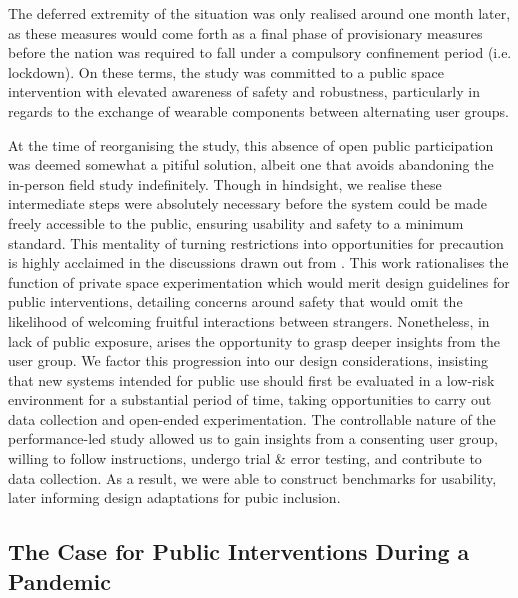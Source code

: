 The deferred extremity of the situation was only realised around one month later, as these measures would come forth as a final phase of provisionary measures before the nation was required to fall under a compulsory confinement period (i.e. lockdown). On these terms, the study was committed to a public space intervention with elevated awareness of safety and robustness, particularly in regards to the exchange of wearable components between alternating user groups.

At the time of reorganising the study, this absence of open public participation was deemed somewhat a pitiful solution, albeit one that avoids abandoning the in-person field study indefinitely. Though in hindsight, we realise these intermediate steps were absolutely necessary before the system could be made freely accessible to the public, ensuring usability and safety to a minimum standard. This mentality of turning restrictions into opportunities for precaution is highly acclaimed in the discussions drawn out from \citeauthor{howell_life-affirming_2019} \cite{howell_life-affirming_2019}. This work rationalises the function of private space experimentation which would merit design guidelines for public interventions, detailing concerns around safety that would omit the likelihood of welcoming fruitful interactions between strangers. Nonetheless, in lack of public exposure, arises the opportunity to grasp deeper insights from the user group. We factor this progression into our design considerations, insisting that new systems intended for public use should first be evaluated in a low-risk environment for a substantial period of time, taking opportunities to carry out data collection and open-ended experimentation. The controllable nature of the performance-led study allowed us to gain insights from a consenting user group, willing to follow instructions, undergo trial \& error testing, and contribute to data collection. As a result, we were able to construct benchmarks for usability, later informing design adaptations for pubic inclusion.

\subsection{The Case for Public Interventions During a Pandemic}
\label{sec:public_adaptation}

